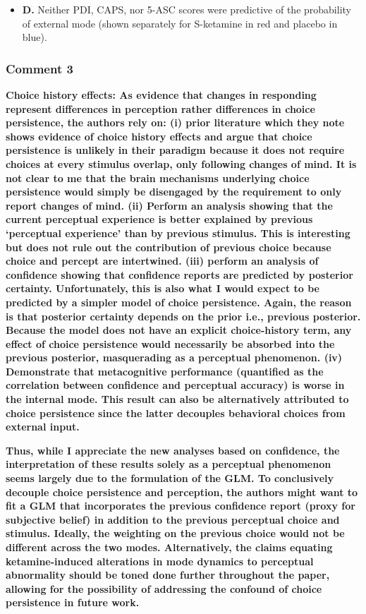 \documentclass[
]{article}
\providecommand{\tightlist}{%
  \setlength{\itemsep}{0pt}\setlength{\parskip}{0pt}}
\begin{document}
\begin{itemize}
\tightlist
\item
  \textbf{D.} Neither PDI, CAPS, nor 5-ASC scores were predictive of the
  probability of external mode (shown separately for S-ketamine in red
  and placebo in blue).
\end{itemize}

\subsubsection{Comment 3}\label{comment-3-3}

\textbf{Choice history effects: As evidence that changes in responding
represent differences in perception rather differences in choice
persistence, the authors rely on: (i) prior literature which they note
shows evidence of choice history effects and argue that choice
persistence is unlikely in their paradigm because it does not require
choices at every stimulus overlap, only following changes of mind. It is
not clear to me that the brain mechanisms underlying choice persistence
would simply be disengaged by the requirement to only report changes of
mind. (ii) Perform an analysis showing that the current perceptual
experience is better explained by previous `perceptual experience' than
by previous stimulus. This is interesting but does not rule out the
contribution of previous choice because choice and percept are
intertwined. (iii) perform an analysis of confidence showing that
confidence reports are predicted by posterior certainty. Unfortunately,
this is also what I would expect to be predicted by a simpler model of
choice persistence. Again, the reason is that posterior certainty
depends on the prior i.e., previous posterior. Because the model does
not have an explicit choice-history term, any effect of choice
persistence would necessarily be absorbed into the previous posterior,
masquerading as a perceptual phenomenon. (iv) Demonstrate that
metacognitive performance (quantified as the correlation between
confidence and perceptual accuracy) is worse in the internal mode. This
result can also be alternatively attributed to choice persistence since
the latter decouples behavioral choices from external input.}

\textbf{Thus, while I appreciate the new analyses based on confidence,
the interpretation of these results solely as a perceptual phenomenon
seems largely due to the formulation of the GLM. To conclusively
decouple choice persistence and perception, the authors might want to
fit a GLM that incorporates the previous confidence report (proxy for
subjective belief) in addition to the previous perceptual choice and
stimulus. Ideally, the weighting on the previous choice would not be
different across the two modes. Alternatively, the claims equating
ketamine-induced alterations in mode dynamics to perceptual abnormality
should be toned done further throughout the paper, allowing for the
possibility of addressing the confound of choice persistence in future
work.}
\end{document}
